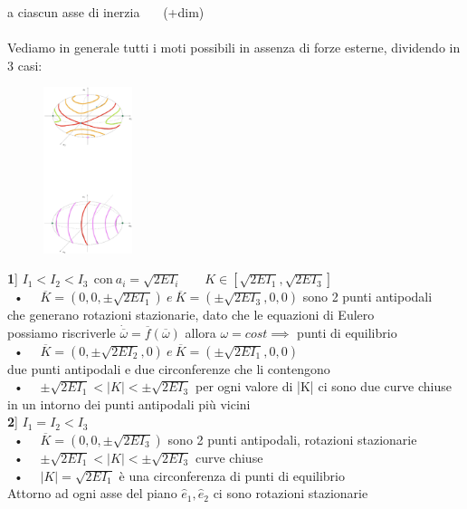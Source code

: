 \documentclass{article}
\theoremstyle{unnumbered}
\theoremstyle{unnumbered1}
\begin{document}
\phantom{Prop: }a ciascun asse di inerzia \ \ \ (+dim)\\ \\
%
%
%
Vediamo in generale tutti i moti possibili in assenza di forze esterne, dividendo in 3 casi:\ \ \ \ \ \ \ \ \ \ \ \ \ \ \ \ \ \ \ \ \ \ \ \ \ \
\begin{figure}
\includegraphics[width=0.23\textwidth]{MotiRL.jpeg}
\end{figure}
%
%
%
\textbf{1}]  $I_1<I_2<I_3 \ \ \text{con} \ a_i=\sqrt{2EI_i}$ \ \ \ $K\in [\sqrt{2EI_1}, \sqrt{2EI_3}]$ \\
%
%
\ • \ \ $\overline{K}=(0,0,\pm \sqrt{2EI_1}) \ e \ \overline{K}=(\pm \sqrt{2EI_3},0,0)$ sono 2 punti antipodali\\
\phantom{\ • \ \ }che generano rotazioni stazionarie,
dato che le equazioni di Eulero\\
\phantom{\ • \ \ }possiamo riscriverle $\dot{\overline{\omega}}=\overline{f}(\overline{\omega})$ allora $\omega=cost \implies$ punti di equilibrio\\ 
\ • \ \ $\overline{K}=(0,\pm \sqrt{2EI_2},0) \ e \ \overline{K}=(\pm \sqrt{2EI_1},0,0)$\\
\phantom{\ • \ \ } due punti antipodali e due circonferenze che li contengono\\
\ • \ \ $\pm \sqrt{2EI_1}< |K|<\pm \sqrt{2EI_3}$ per ogni valore di |K| ci sono due curve chiuse\\
\phantom{\ • \ \ }in un intorno dei punti antipodali più vicini \\
%
%
%
\textbf{2}] $I_1=I_2<I_3$\\
\ • \ \ $\overline{K}=(0,0,\pm \sqrt{2EI_3})$ sono 2 punti antipodali, rotazioni stazionarie\\ 
\ • \ \ $\pm \sqrt{2EI_1}< |K|<\pm \sqrt{2EI_3}$ curve chiuse\\
\ • \ \ $|K|=\sqrt{2EI_1}$ è una circonferenza di punti di equilibrio\\
Attorno ad ogni asse del piano $\hat{e}_1, \hat{e}_2$ ci sono rotazioni stazionarie\\
\end{document}
